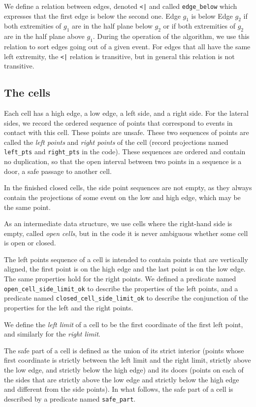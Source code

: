\documentclass[a4paper, USenglish, cleveref, autoref, thm-restate, final]{lipics-v2021}
\begin{document}
We define a relation between edges, denoted {\tt <|} and called
{\tt edge\_below} which expresses
that the first edge is below the second one.  Edge \(g_1\) is below Edge
\(g_2\) if both extremities of \(g_1\) are in the half plane below
\(g_2\) or if both extremities of \(g_2\) are in the half plane above
\(g_1\).  During the operation of the algorithm, we use this relation
to sort edges going out of a given event.  For edges that all have the
same left extremity, the {\tt <|} relation is transitive, but in
general this relation is not transitive.
\subsection{The cells}
Each cell has a high edge, a low edge, a left side, and a right side.  For
the lateral sides, we record the ordered sequence of points that
correspond  to events in contact with this cell.  These points are
unsafe.  These two sequences of points are called the {\em left points} 
and {\em right points} of the cell (record projections
named {\tt left\_pts} and {\tt right\_pts} in the code).
These sequences are
ordered and contain no duplication, so that the open interval between two
points in a sequence is a door, a safe passage to another cell.

In the finished closed cells, the side point sequences are not empty,
as they always contain the projections of some event on the low and high
edge, which may be the same point.

As an intermediate data structure, we use cells where the
right-hand side is empty, called {\em open cells}, but in the code
it is never ambiguous whether some cell is open or closed.

The left points sequence of a cell is intended to contain
points that are vertically aligned, the first point is on the high edge
and the last point is on the low edge.  The same properties hold for the
right points.  We defined a predicate named
{\tt open\_cell\_side\_limit\_ok} to describe the properties of the
left points, and a predicate named {\tt closed\_cell\_side\_limit\_ok} to
describe the conjunction of the properties for the left and the right points.

We define the {\em left limit} of a cell to be the first coordinate of
the first left point, and similarly for the {\em right limit}.

The safe part of a cell is defined as the union of its strict interior
(points whose first coordinate is strictly between the left limit and the
right limit, strictly above the low edge, and strictly below the
high edge) and its doors (points on each of the sides that are
strictly above the low edge and strictly below the high edge and
different from the side points).  In what follows, the safe part of a cell
is described by a predicate named {\tt safe\_part}.
\end{document}
